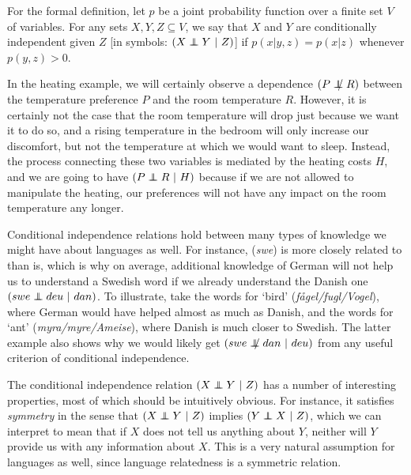 For the formal definition, let $p$ be a joint probability function over a finite set $V$ of variables. For any sets $X,Y,Z \subseteq V$, we say that $X$ and $Y$ are conditionally independent given $Z$ [in symbols: $(X \independent Y\ |\ Z)$] if $p(x|y,z) = p(x|z)$ whenever $p(y,z) > 0$.

In the heating example, we will certainly observe a dependence $(P \notindep R)$ between the temperature preference $P$ and the room temperature $R$. However, it is certainly not the case that the room temperature will drop just because we want it to do so, and a rising temperature in the bedroom will only increase our discomfort, but not the temperature at which we would want to sleep. Instead, the process connecting these two variables is mediated by the heating costs $H$, and we are going to have $(P \independent R\ |\ H)$ because if we are not allowed to manipulate the heating, our preferences will not have any impact on the room temperature any longer.

Conditional independence relations hold between many types of knowledge we might have about languages as well. For instance,  (\textit{swe}) is more closely related to  than  is, which is why on average, additional knowledge of German will not help us to understand a Swedish word if we already understand the Danish one $(swe \independent deu\ |\ dan)$. To illustrate, take the words for `bird' (\textit{fågel/fugl/Vogel}), where German would have helped almost as much as Danish, and the words for `ant' (\textit{myra/myre/Ameise}), where Danish is much closer to Swedish. The latter example also shows why we would likely get $(swe \notindep dan\ |\ deu)$ from any useful criterion of conditional independence.

The conditional independence relation $(X \independent Y\ |\ Z)$ has a number of interesting properties, most of which should be intuitively obvious. For instance, it satisfies \textit{symmetry} in the sense that $(X \independent Y\ |\ Z)$ implies $(Y \independent X\ |\ Z)$, which we can interpret to mean that if $X$ does not tell us anything about $Y$, neither will $Y$ provide us with any information about $X$. This is a very natural assumption for languages as well, since language relatedness is a symmetric relation. 

